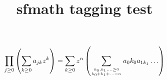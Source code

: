 \documentclass{article}
\title{sfmath tagging test}
\begin{document}
\begin{equation}
  \prod_{j\geq 0}
  \left(\sum_{k\geq 0}a_{jk} z^k\right)
= \sum_{k\geq 0} z^n
  \left( \sum_{{k_0,k_1,\ldots\geq 0}
          \atop{k_0+k_1+\ldots=n}    }
        a{_0k_0}a_{1k_1}\ldots  \right)
\end{equation}
\end{document}
